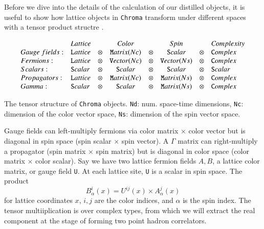 Before we dive into the details of the calculation of our distilled objects, it is useful to show how lattice objects in \texttt{Chroma} transform under different spaces with a tensor product structre \cite{Edwards_2005}. 
\begin{table}
  \centering
\begin{displaymath}
  \begin{array}{llcccccl}
                    & {\textit Lattice} &    &  {\textit Color} &     & {\textit Spin}  &     & {\textit Complexity}\\
  {Gauge\ fields:}& {\texttt Lattice} &\otimes& {\texttt Matrix(Nc)}&\otimes& {\texttt Scalar}    &\otimes& {\texttt Complex}\\
  {Fermions:}    & {\texttt Lattice} &\otimes& {\texttt Vector(Nc)}&\otimes& {\texttt Vector(Ns)}&\otimes& {\texttt Complex}\\
  {Scalars:}     & {\texttt Scalar}  &\otimes& {\texttt Scalar}    &\otimes& {\texttt Scalar}    &\otimes& {\texttt Scalar} \\
  {Propagators:} & {\texttt Lattice} &\otimes& {\texttt Matrix(Nc)}&\otimes& {\texttt Matrix(Ns)}&\otimes& {\texttt Complex}\\
  {Gamma:}       & {\texttt Scalar}  &\otimes& {\texttt Scalar}    &\otimes& {\texttt Matrix(Ns)}&\otimes& {\texttt Complex}\\
  \end{array}
  \end{displaymath}
  \caption{The tensor structure of \texttt{Chroma} objects. \texttt{Nd}: num. space-time dimensions, \texttt{Nc}: dimension of the color vector space, \texttt{Ns}: dimension of the spin vector space.
  \cite{Edwards_2005}}
    \label{fig:chroma}
\end{table}
Gauge fields can left-multiply fermions via color matrix $\times$ color vector but is diagonal in spin space (spin scalar $\times$ spin vector).
A $\Gamma$ matrix can right-multiply a propagator (spin matrix $\times$ spin matrix) but is diagonal in color space (color matrix $\times$ color
scalar). Say we have two lattice fermion fields $A, B$, a lattice color matrix, or gauge field \texttt{U}. At each lattice site, \texttt{U} is a scalar in spin space. The product 
\begin{equation}
  B_\alpha^i (x) = U^{ij}(x) \times A_\alpha^j(x)
\end{equation} for lattice coordinates $x$, $i,j$ are the color indices, and $\alpha$ is the spin index. The tensor multiiplication is over complex types, from which we will extract the real component at the stage of forming two point hadron correlators.  


